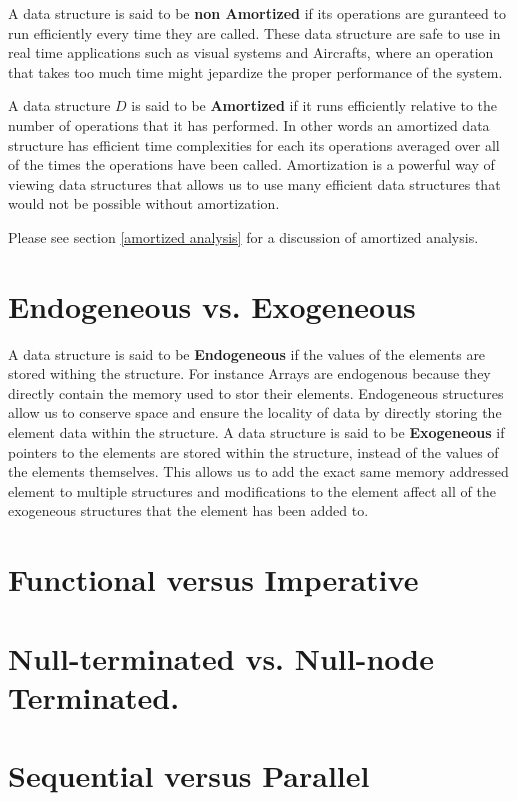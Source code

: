 \documentclass[12pt, letterpaper]{book}
\begin{document}
A data structure is said to be \textbf{non Amortized} if its operations are guranteed to run efficiently every time they are called. These data structure are safe to use in real time applications such as visual systems and Aircrafts, where an operation that takes too much time might jepardize the proper performance of the system.

A data structure $D$ is said to be \textbf{Amortized} if it runs efficiently relative to the number of operations that it has performed. In other words an amortized data structure has efficient time complexities for each its operations averaged over all of the times the operations have been called. Amortization is a powerful way of viewing data structures that allows us to use many efficient data structures that would not be possible without amortization.

Please see section \ref{amortized analysis} for a discussion of amortized analysis.

\section{Endogeneous vs. Exogeneous}

A data structure is said to be \textbf{Endogeneous} if the values of the elements are stored withing the structure. For instance Arrays are endogenous because they directly contain the memory used to stor their elements. Endogeneous structures allow us to conserve space and ensure the locality of data by directly storing the element data within the structure.
A data structure is said to be \textbf{Exogeneous} if pointers to the elements are stored within the structure, instead of the values of the elements themselves. This allows us to add the exact same memory addressed element to multiple structures and modifications to the element affect all of the exogeneous structures that the element has been added to.

\section{Functional versus Imperative}

\section[Null vs. Node terminals]{Null-terminated vs. Null-node Terminated.}

\section{Sequential versus Parallel}
\end{document}
